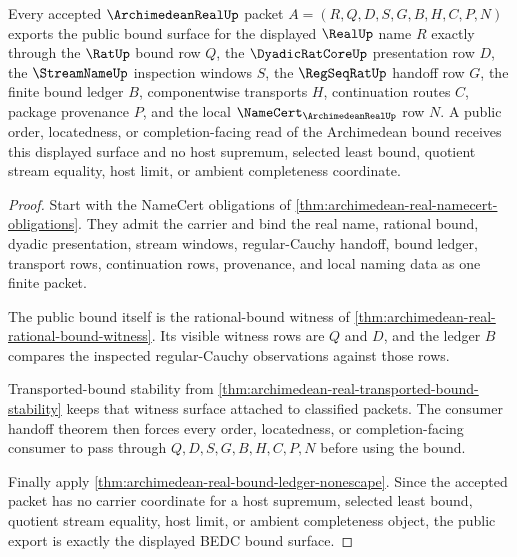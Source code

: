 \begin{theorem}
\label{thm:archimedean-real-public-bound-export}
Every accepted $\ArchimedeanRealUp$ packet $A=(R,Q,D,S,G,B,H,C,P,N)$ exports the public bound surface for the displayed $\RealUp$ name $R$ exactly through the $\RatUp$ bound row $Q$, the $\DyadicRatCoreUp$ presentation row $D$, the $\StreamNameUp$ inspection windows $S$, the $\RegSeqRatUp$ handoff row $G$, the finite bound ledger $B$, componentwise transports $H$, continuation routes $C$, package provenance $P$, and the local $\NameCert_{\ArchimedeanRealUp}$ row $N$. A public order, locatedness, or completion-facing read of the Archimedean bound receives this displayed surface and no host supremum, selected least bound, quotient stream equality, host limit, or ambient completeness coordinate.
\end{theorem}
\begin{proof}
Start with the NameCert obligations of \autoref{thm:archimedean-real-namecert-obligations}. They admit the carrier and bind the real name, rational bound, dyadic presentation, stream windows, regular-Cauchy handoff, bound ledger, transport rows, continuation rows, provenance, and local naming data as one finite packet.

The public bound itself is the rational-bound witness of \autoref{thm:archimedean-real-rational-bound-witness}. Its visible witness rows are $Q$ and $D$, and the ledger $B$ compares the inspected regular-Cauchy observations against those rows.

Transported-bound stability from \autoref{thm:archimedean-real-transported-bound-stability} keeps that witness surface attached to classified packets. The consumer handoff theorem then forces every order, locatedness, or completion-facing consumer to pass through $Q,D,S,G,B,H,C,P,N$ before using the bound.

Finally apply \autoref{thm:archimedean-real-bound-ledger-nonescape}. Since the accepted packet has no carrier coordinate for a host supremum, selected least bound, quotient stream equality, host limit, or ambient completeness object, the public export is exactly the displayed BEDC bound surface.
\end{proof}

